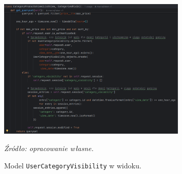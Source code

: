 \documentclass[12pt,a4paper,oneside]{article}
\theoremstyle{definition}
\numberwithin{equation}{section}
\begin{document}
\begin{figure}[H]
    \centering
    \includegraphics[width=0.8\textwidth]{images/krzysztofBImages/category_visibility_usage.png}
    \caption{Model \texttt{UserCategoryVisibility} w widoku.}
    \emph{Źródło: opracowanie własne.}
    \label{fig:user_category_visibility}
\end{figure}
%
%
\end{document}
